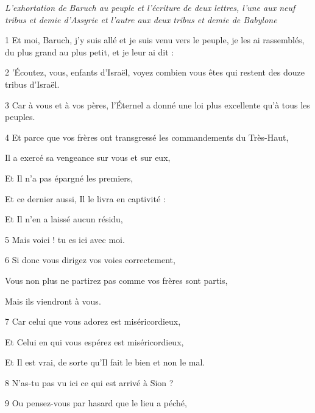 \par \textit{L'exhortation de Baruch au peuple et l'écriture de deux lettres, l'une aux neuf tribus et demie d'Assyrie et l'autre aux deux tribus et demie de Babylone}


\par 1 Et moi, Baruch, j'y suis allé et je suis venu vers le peuple, je les ai rassemblés, du plus grand au plus petit, et je leur ai dit :

\par 2 'Écoutez, vous, enfants d'Israël, voyez combien vous êtes qui restent des douze tribus d'Israël.

\par 3 Car à vous et à vos pères, l'Éternel a donné une loi plus excellente qu'à tous les peuples.

\par 4 Et parce que vos frères ont transgressé les commandements du Très-Haut,

\par Il a exercé sa vengeance sur vous et sur eux,

\par Et Il n'a pas épargné les premiers,

\par Et ce dernier aussi, Il le livra en captivité :

\par Et Il n’en a laissé aucun résidu,

\par 5 Mais voici ! tu es ici avec moi.

\par 6 Si donc vous dirigez vos voies correctement,

\par Vous non plus ne partirez pas comme vos frères sont partis,

\par Mais ils viendront à vous.

\par 7 Car celui que vous adorez est miséricordieux,

\par Et Celui en qui vous espérez est miséricordieux,

\par Et Il est vrai, de sorte qu'Il fait le bien et non le mal.

\par 8 N'as-tu pas vu ici ce qui est arrivé à Sion ?

\par 9 Ou pensez-vous par hasard que le lieu a péché,

